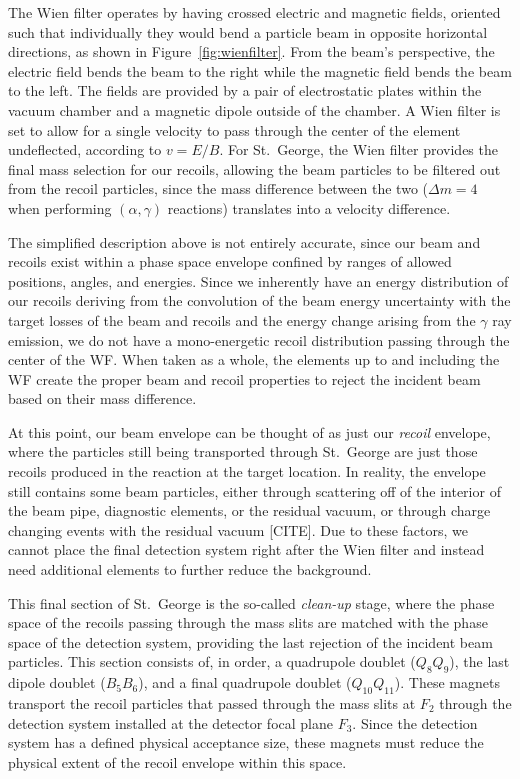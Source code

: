 The Wien filter operates by having crossed electric and magnetic fields,
oriented such that individually they would bend a particle beam in
opposite horizontal directions, as shown in Figure~\ref{fig:wienfilter}.
From the beam's perspective, the electric field bends the beam to the
right while the magnetic field bends the beam to the left. The fields
are provided by a pair of electrostatic plates within the vacuum chamber
and a magnetic dipole outside of the chamber. A Wien filter is set to
allow for a single velocity to pass through the center of the element
undeflected, according to $v = E/B$. For St.\ George, the Wien filter
provides the final mass selection for our recoils, allowing the beam
particles to be filtered out from the recoil particles, since the mass
difference between the two ($\Delta m = 4$ when performing
$(\alpha,\gamma)$ reactions) translates into a velocity difference.

The simplified description above is not entirely accurate, since our
beam and recoils exist within a phase space envelope confined by ranges
of allowed positions, angles, and energies. Since we inherently have an
energy distribution of our recoils deriving from the convolution of the
beam energy uncertainty with the target losses of the beam and recoils
and the energy change arising from the $\gamma$ ray emission, we do not
have a mono-energetic recoil distribution passing through the center of
the WF. When taken as a whole, the elements up to and including the WF
create the proper beam and recoil properties to reject the incident beam
based on their mass difference.

At this point, our beam envelope can be thought of as just our
\textit{recoil} envelope, where the particles still being transported
through St.\ George are just those recoils produced in the reaction at
the target location. In reality, the envelope still contains some beam
particles, either through scattering off of the interior of the beam
pipe, diagnostic elements, or the residual vacuum, or through charge
changing events with the residual vacuum [CITE]. Due to these factors,
we cannot place the final detection system right after the Wien filter
and instead need additional elements to further reduce the background.

This final section of St.\ George is the so-called \textit{clean-up}
stage, where the phase space of the recoils passing through the mass
slits are matched with the phase space of the detection system,
providing the last rejection of the incident beam particles. This
section consists of, in order, a quadrupole doublet ($Q_8Q_9$), the last
dipole doublet ($B_5B_6$), and a final quadrupole doublet
($Q_{10}Q_{11}$). These magnets transport the recoil particles that
passed through the mass slits at $F_2$ through the detection system
installed at the detector focal plane $F_3$. Since the detection system
has a defined physical acceptance size, these magnets must reduce the
physical extent of the recoil envelope within this space.


